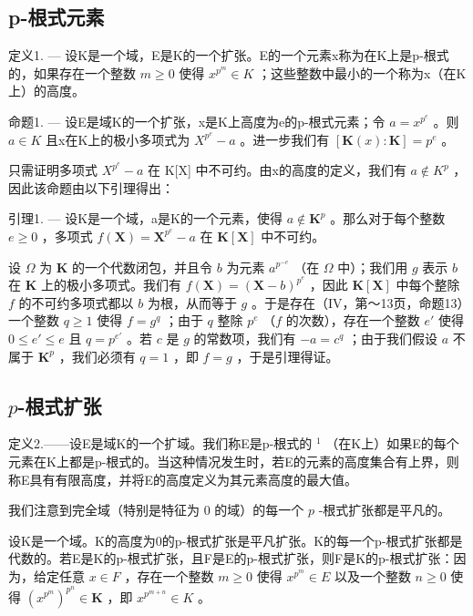 \subsection{p-根式元素}

定义1. --- 设K是一个域，E是K的一个扩张。E的一个元素x称为在K上是p-根式的，如果存在一个整数 \(m \geqslant 0\) 使得 \(x^{p^{m}} \in K\) ；这些整数中最小的一个称为x（在K上）的高度。

命题1. --- 设E是域K的一个扩张，x是K上高度为e的p-根式元素；令 \(a = x^{p^{e}}\) 。则 \(a \in K\) 且x在K上的极小多项式为 \(X^{p^{e}} - a\) 。进一步我们有 \([\mathbf{K}(x): \mathbf{K}] = p^{e}\) 。

只需证明多项式 \(X^{p^{e}} - a\) 在 K{[}X{]} 中不可约。由x的高度的定义，我们有 \(a \notin K^{p}\) ，因此该命题由以下引理得出：

引理1. --- 设K是一个域，a是K的一个元素，使得 \(a \notin \mathbf{K}^p\) 。那么对于每个整数 \(e \geqslant 0\) ，多项式 \(f(\mathbf{X}) = \mathbf{X}^{p^e} - a\) 在 \(\mathbf{K}[\mathbf{X}]\) 中不可约。

设 \(\Omega\) 为 \(\mathbf{K}\) 的一个代数闭包，并且令 \(b\) 为元素 \(a^{p^{-e}}\) （在 \(\Omega\) 中）；我们用 \(g\) 表示 \(b\) 在 \(\mathbf{K}\) 上的极小多项式。我们有 \(f(\mathbf{X}) = (\mathbf{X} - b)^{p^e}\) ，因此 \(\mathbf{K}[\mathbf{X}]\) 中每个整除 \(f\) 的不可约多项式都以 \(b\) 为根，从而等于 \(g\) 。于是存在（IV，第～13页，命题13）一个整数 \(q \geqslant 1\) 使得 \(f = g^q\) ；由于 \(q\) 整除 \(p^e\) （\(f\) 的次数），存在一个整数 \(e'\) 使得 \(0 \leqslant e' \leqslant e\) 且 \(q = p^{e'}\) 。若 \(c\) 是 \(g\) 的常数项，我们有 \(-a = c^q\) ；由于我们假设 \(a\) 不属于 \(\mathbf{K}^p\) ，我们必须有 \(q = 1\) ，即 \(f = g\) ，于是引理得证。

\subsection{\texorpdfstring{\(p\)-根式扩张}{p-根式扩张}}

定义2.——设E是域K的一个扩域。我们称E是p-根式的 \(^{1}\) （在K上）如果E的每个元素在K上都是p-根式的。当这种情况发生时，若E的元素的高度集合有上界，则称E具有有限高度，并将E的高度定义为其元素高度的最大值。

我们注意到完全域（特别是特征为 0 的域）的每一个 \(p\) -根式扩张都是平凡的。

设K是一个域。K的高度为0的p-根式扩张是平凡扩张。K的每一个p-根式扩张都是代数的。若E是K的p-根式扩张，且F是E的p-根式扩张，则F是K的p-根式扩张：因为，给定任意 \(x \in F\) ，存在一个整数 \(m \geqslant 0\) 使得 \(x^{p^{m}} \in E\) 以及一个整数 \(n \geqslant 0\) 使得 \((x^{p^{m}})^{p^{n}} \in \mathbf{K}\) ，即 \(x^{p^{m+n}} \in K\) 。

